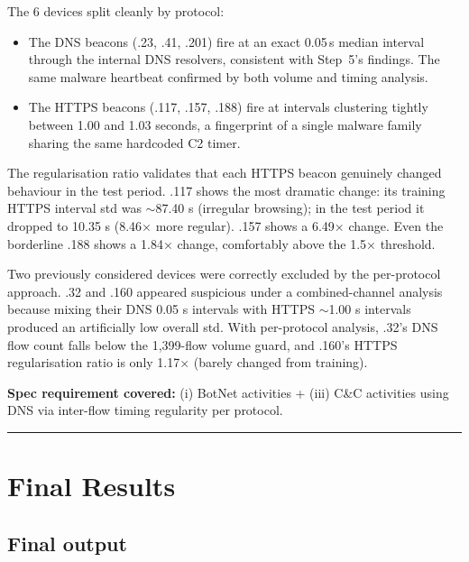 \documentclass[
  11pt,
]{article}
\begin{document}
The 6 devices split cleanly by protocol:
\begin{itemize}
  \item The DNS beacons (.23, .41, .201) fire at an exact 0.05\,s median interval through the internal DNS resolvers, consistent with Step~5's findings. The same malware heartbeat confirmed by both volume and timing analysis.
  \item The HTTPS beacons (.117, .157, .188) fire at intervals clustering tightly between 1.00 and 1.03 seconds, a fingerprint of a single malware family sharing the same hardcoded C2 timer.
\end{itemize}

The regularisation ratio validates that each HTTPS beacon genuinely
changed behaviour in the test period. .117 shows the most dramatic
change: its training HTTPS interval std was $\sim$87.40 s
(irregular browsing); in the test period it dropped to 10.35 s (8.46×
more regular). .157 shows a 6.49× change. Even the borderline .188 shows
a 1.84× change, comfortably above the 1.5× threshold.

Two previously considered devices were correctly excluded by the
per-protocol approach. .32 and .160 appeared suspicious under a
combined-channel analysis because mixing their DNS 0.05 s intervals with
HTTPS $\sim$1.00 s intervals produced an artificially low
overall std. With per-protocol analysis, .32's DNS flow count falls
below the 1,399-flow volume guard, and .160's HTTPS regularisation ratio
is only 1.17× (barely changed from training).

\medskip
\noindent\colorbox{gray!12}{\parbox{\dimexpr\linewidth-2\fboxsep\relax}{\textbf{Spec requirement covered:} (i) BotNet activities + (iii) C\&C activities using DNS via inter-flow timing regularity per protocol.}}

\begin{center}\rule{0.5\linewidth}{0.5pt}\end{center}
\newpage

\hypertarget{final-results}{%
\section{Final Results}\label{final-results}}

\hypertarget{final-output}{%
\subsection{Final output}\label{final-output}}
\end{document}
